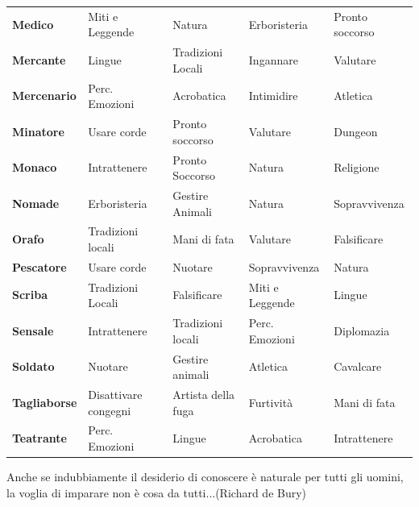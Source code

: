 \begin{tabularx}{\linewidth}{X|l|l|l|l}
\rowcolor{gray!20}\textbf{Medico}& Miti e Leggende&Natura&Erboristeria&Pronto soccorso\\
\textbf{Mercante}& Lingue&Tradizioni Locali&Ingannare&Valutare\\
\rowcolor{gray!20}\textbf{Mercenario} & Perc. Emozioni & Acrobatica & Intimidire & Atletica\\
\textbf{Minatore}& Usare corde&Pronto soccorso&Valutare&Dungeon\\
\rowcolor{gray!20}\textbf{Monaco} & Intrattenere &Pronto Soccorso & Natura & Religione\\
\textbf{Nomade}&  Erboristeria& Gestire Animali & Natura &  Sopravvivenza\\
\rowcolor{gray!20}\textbf{Orafo} & Tradizioni locali & Mani di fata & Valutare & Falsificare\\
\textbf{Pescatore}& Usare corde&Nuotare&Sopravvivenza&Natura\\
\rowcolor{gray!20}\textbf{Scriba} &Tradizioni Locali& Falsificare & Miti e Leggende & Lingue\\
\textbf{Sensale} & Intrattenere & Tradizioni locali & Perc. Emozioni & Diplomazia\\
\rowcolor{gray!20}\textbf{Soldato}& Nuotare&Gestire animali&Atletica&Cavalcare\\
\textbf{Tagliaborse} & Disattivare congegni&Artista della fuga&Furtività&Mani di fata\\
\rowcolor{gray!20}\textbf{Teatrante}& Perc. Emozioni& Lingue&Acrobatica&Intrattenere\\
\end{tabularx}

\vfill

\begin{enfasi}{
Anche se indubbiamente il desiderio di conoscere è naturale per tutti gli uomini, la voglia di imparare non è cosa da tutti...(Richard de Bury)
}\end{enfasi}

